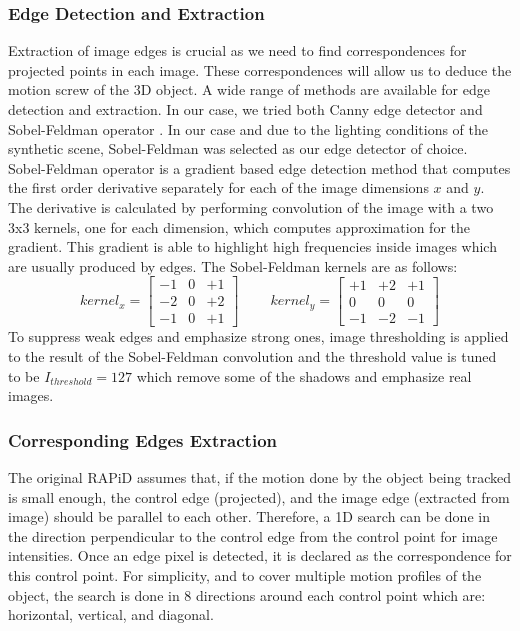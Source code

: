 \documentclass{article}
\begin{document}
\subsubsection{Edge Detection and Extraction}
Extraction of image edges is crucial as we need to find correspondences for projected points in each image. These correspondences will allow us to deduce the motion screw of the 3D object. A wide range of methods are available for edge detection and extraction. In our case, we tried both Canny edge detector \cite{canny1986computational} and Sobel-Feldman operator \cite{Sobel1990AnI3}. In our case and due to the lighting conditions of the synthetic scene, Sobel-Feldman was selected as our edge detector of choice. \\
Sobel-Feldman operator\cite{Sobel1990AnI3} is a gradient based edge detection method that computes the first order derivative separately for each of the image dimensions $x$ and $y$. The derivative is calculated by performing convolution of the image with a two 3x3 kernels, one for each dimension, which computes approximation for the gradient. This gradient is able to highlight high frequencies inside images which are usually produced by edges. The Sobel-Feldman kernels are as follows:
\begin{equation}
kernel_x = \begin{bmatrix}
-1 & 0 & +1 \\ -2 & 0 & +2 \\ -1 & 0 & +1
\end{bmatrix} \;\;\;\;\;\;\;\;
kernel_y = \begin{bmatrix}
+1 & +2 & +1 \\
0 & 0 & 0 \\
-1 & -2 & -1 
\end{bmatrix}
\end{equation}
To suppress weak edges and emphasize strong ones, image thresholding is applied to the result of the Sobel-Feldman convolution and the threshold value is tuned to be $I_{threshold} = 127$ which remove some of the shadows and emphasize real images. 
\subsubsection{Corresponding Edges Extraction}
The original RAPiD \cite{harris1990rapid} assumes that, if the motion done by the object being tracked is small enough, the control edge (projected), and the image edge (extracted from image) should be parallel to each other. Therefore, a 1D search can be done in the direction perpendicular to the control edge from the control point for image intensities. Once an edge pixel is detected, it is declared as the correspondence for this control point. For simplicity, and to cover multiple motion profiles of the object, the search is done in 8 directions around each control point which are: horizontal, vertical, and diagonal. 
\end{document}
